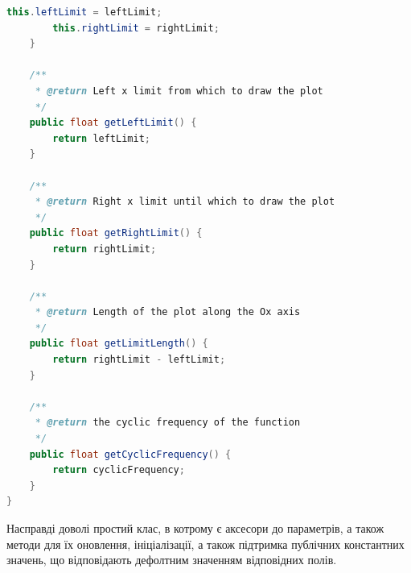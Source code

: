 \documentclass[oneside,solution]{android-assign}
\begin{document}
\begin{lstlisting}[language=java]
        this.leftLimit = leftLimit;
        this.rightLimit = rightLimit;
    }

    /**
     * @return Left x limit from which to draw the plot
     */
    public float getLeftLimit() {
        return leftLimit;
    }

    /**
     * @return Right x limit until which to draw the plot
     */
    public float getRightLimit() {
        return rightLimit;
    }

    /**
     * @return Length of the plot along the Ox axis
     */
    public float getLimitLength() {
        return rightLimit - leftLimit;
    }

    /**
     * @return the cyclic frequency of the function
     */
    public float getCyclicFrequency() {
        return cyclicFrequency;
    }
}
\end{lstlisting}

Насправді доволі простий клас, в котрому є аксесори до параметрів, а також методи для їх оновлення, ініціалізації, а також підтримка публічних константних значень, що відповідають дефолтним значенням відповідних полів.
\end{document}
